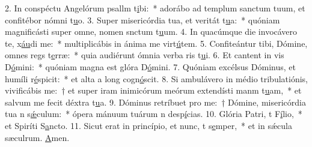 2. In conspéctu Angelórum psallm t\uline{i}bi:~* adorábo ad templum sanctum tuum, et confitébor nómni t\uline{u}o.
3. Super misericórdia tua, et veritát t\uline{u}a:~* quóniam magnificásti super omne, nomen snctum t\uline{u}um.
4. In quacúmque die invocávero te, x\uline{áu}di me:~* multiplicábis in ánima me virt\uline{ú}tem.
5. Confiteántur tibi, Dómine, omnes regs t\uline{e}rræ:~* quia audiérunt ómnia verba ris t\uline{u}i.
6. Et cantent in vis D\uline{ó}mini:~* quóniam magna est glóra D\uline{ó}mini.
7. Quóniam excélsus Dóminus, et humíli r\uline{é}spicit:~* et alta a long cogn\uline{ó}scit.
8. Si ambulávero in médio tribulatiónis, vivificábis me:~† et super iram inimicórum meórum extendísti manm t\uline{u}am,~* et salvum me fecit déxtra t\uline{u}a.
9. Dóminus retríbuet pro me:~† Dómine, misericórdia tua n s\uline{ǽ}culum:~* ópera mánuum tuárum n desp\uline{í}cias.
10. Glória Patri, t F\uline{í}lio,~* et Spiríti S\uline{a}ncto.
11. Sicut erat in princípio, et nunc, t s\uline{e}mper,~* et in sǽcula sæculrum. \uline{A}men.
